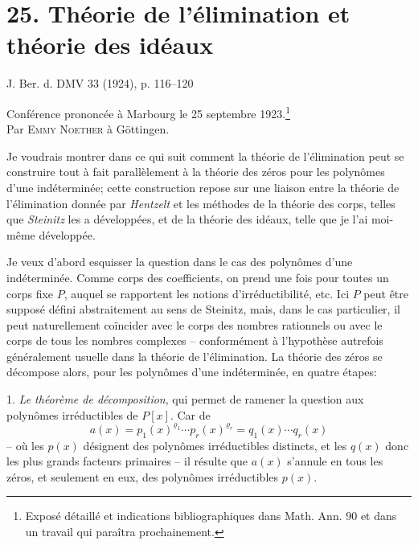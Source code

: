 \setcounter{footnote}{0}
\providecommand{\frakS}{\mathfrak S}
\providecommand{\fraka}{\mathfrak a}
\providecommand{\frakp}{\mathfrak p}
\providecommand{\frakq}{\mathfrak q}
\providecommand{\frakR}{\mathfrak R}

\section*{25. Théorie de l'élimination et théorie des idéaux}

\begin{center}
J. Ber. d. DMV 33 (1924), p. 116--120
\end{center}

\begin{center}
Conférence prononcée à Marbourg le 25 septembre 1923.\footnote{Exposé détaillé et indications bibliographiques dans Math. Ann. 90 et dans un travail qui paraîtra prochainement.}\\[0.5em]
Par \textsc{Emmy Noether} à Göttingen.
\end{center}

Je voudrais montrer dans ce qui suit comment la théorie de l'élimination peut se construire tout à fait parallèlement à la théorie des zéros pour les polynômes d'une indéterminée; cette construction repose sur une liaison entre la théorie de l'élimination donnée par \emph{Hentzelt} et les méthodes de la théorie des corps, telles que \emph{Steinitz} les a développées, et de la théorie des idéaux, telle que je l'ai moi-même développée.

Je veux d'abord esquisser la question dans le cas des polynômes d'une indéterminée. Comme corps des coefficients, on prend une fois pour toutes un corps fixe $P$, auquel se rapportent les notions d'irréductibilité, etc. Ici $P$ peut être supposé défini abstraitement au sens de Steinitz, mais, dans le cas particulier, il peut naturellement coïncider avec le corps des nombres rationnels ou avec le corps de tous les nombres complexes -- conformément à l'hypothèse autrefois généralement usuelle dans la théorie de l'élimination. La théorie des zéros se décompose alors, pour les polynômes d'une indéterminée, en quatre étapes:

1. \emph{Le théorème de décomposition}, qui permet de ramener la question aux polynômes irréductibles de $P[x]$. Car de
\[
 a(x)=p_1(x)^{\varrho_1}\cdots p_r(x)^{\varrho_r}=q_1(x)\cdots q_r(x)
\]
-- où les $p(x)$ désignent des polynômes irréductibles distincts, et les $q(x)$ donc les plus grands facteurs primaires -- il résulte que $a(x)$ s'annule en tous les zéros, et seulement en eux, des polynômes irréductibles $p(x)$.

